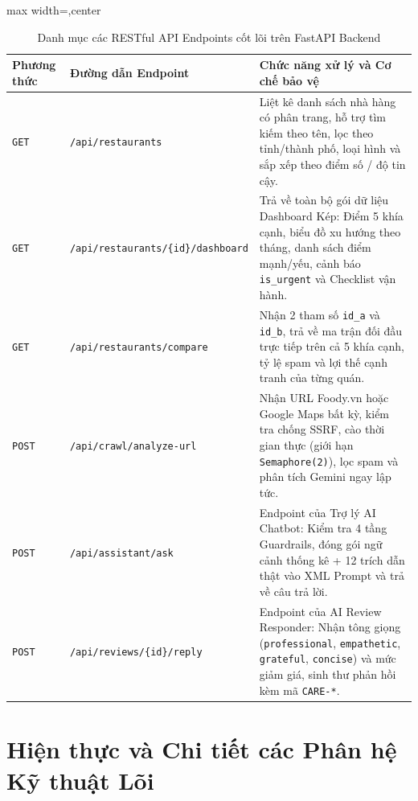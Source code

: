 \documentclass[12pt, a4paper]{article}
\begin{document}
\begin{table}[!htbp]
\centering
\caption{Danh mục các RESTful API Endpoints cốt lõi trên FastAPI Backend}
\vspace{0.15cm}
\footnotesize
\begin{adjustbox}{max width=\textwidth,center}
\begin{tabularx}{0.97\textwidth}{l l X}
\toprule
\rowcolor{blue!8}
\textbf{Phương thức} & \textbf{Đường dẫn Endpoint} & \textbf{Chức năng xử lý và Cơ chế bảo vệ} \\
\midrule
\texttt{GET} & \texttt{/api/restaurants} & Liệt kê danh sách nhà hàng có phân trang, hỗ trợ tìm kiếm theo tên, lọc theo tỉnh/thành phố, loại hình và sắp xếp theo điểm số / độ tin cậy. \\
\addlinespace
\texttt{GET} & \texttt{/api/restaurants/\{id\}/dashboard} & Trả về toàn bộ gói dữ liệu Dashboard Kép: Điểm 5 khía cạnh, biểu đồ xu hướng theo tháng, danh sách điểm mạnh/yếu, cảnh báo \texttt{is\_urgent} và Checklist vận hành. \\
\addlinespace
\texttt{GET} & \texttt{/api/restaurants/compare} & Nhận 2 tham số \texttt{id\_a} và \texttt{id\_b}, trả về ma trận đối đầu trực tiếp trên cả 5 khía cạnh, tỷ lệ spam và lợi thế cạnh tranh của từng quán. \\
\addlinespace
\texttt{POST} & \texttt{/api/crawl/analyze-url} & Nhận URL Foody.vn hoặc Google Maps bất kỳ, kiểm tra chống SSRF, cào thời gian thực (giới hạn \texttt{Semaphore(2)}), lọc spam và phân tích Gemini ngay lập tức. \\
\addlinespace
\texttt{POST} & \texttt{/api/assistant/ask} & Endpoint của Trợ lý AI Chatbot: Kiểm tra 4 tầng Guardrails, đóng gói ngữ cảnh thống kê + 12 trích dẫn thật vào XML Prompt và trả về câu trả lời. \\
\addlinespace
\texttt{POST} & \texttt{/api/reviews/\{id\}/reply} & Endpoint của AI Review Responder: Nhận tông giọng (\texttt{professional}, \texttt{empathetic}, \texttt{grateful}, \texttt{concise}) và mức giảm giá, sinh thư phản hồi kèm mã \texttt{CARE-*}. \\
\bottomrule
\end{tabularx}
\end{adjustbox}
\end{table}

\clearpage
\section{Hiện thực và Chi tiết các Phân hệ Kỹ thuật Lõi}
\end{document}
